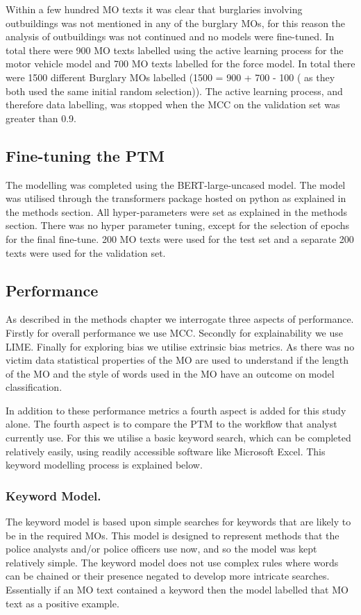 Within a few hundred MO texts it was clear that burglaries involving outbuildings was not mentioned in any of the burglary MOs, for this reason the analysis of outbuildings was not continued and no models were fine-tuned. In total there were 900 MO texts labelled using the active learning process for the motor vehicle model and 700 MO texts labelled for the force model. In total there were 1500 different Burglary MOs labelled (1500 = 900 + 700 - 100 ( as they both used the same initial random selection)). The active learning process, and therefore data labelling, was stopped when the MCC on the validation set was greater than 0.9.

\subsection{Fine-tuning the PTM} The modelling was completed using the BERT-large-uncased model. The model was utilised through the transformers package hosted on python as explained in the methods section. All hyper-parameters were set as explained in the methods section. There was no hyper parameter tuning, except for the selection of epochs for the final fine-tune. 200 MO texts were used for the test set and a separate 200 texts were used for the validation set.  

\subsection{Performance} As described in the methods chapter we interrogate three aspects of performance. Firstly for overall performance we use MCC. Secondly for explainability we use LIME. Finally for exploring bias we utilise extrinsic bias metrics. As there was no victim data statistical properties of the MO are used to understand if the length of the MO and the style of words used in the MO have an outcome on model classification. 

In addition to these performance metrics a fourth aspect is added for this study alone. The fourth aspect is to compare the PTM to the workflow that analyst currently use. For this we utilise a basic keyword search, which can be completed relatively easily, using readily accessible software like Microsoft Excel.  This keyword modelling process is explained below.

\subsubsection{Keyword Model.} The keyword model is based upon simple searches for keywords that are likely to be in the required MOs. This model is designed to represent methods that the police analysts and/or police officers use now, and so the model was kept relatively simple. The keyword model does not use complex rules where words can be chained or their presence negated to develop more intricate searches. Essentially if an MO text contained a keyword then the model labelled that MO text as a positive example. 

